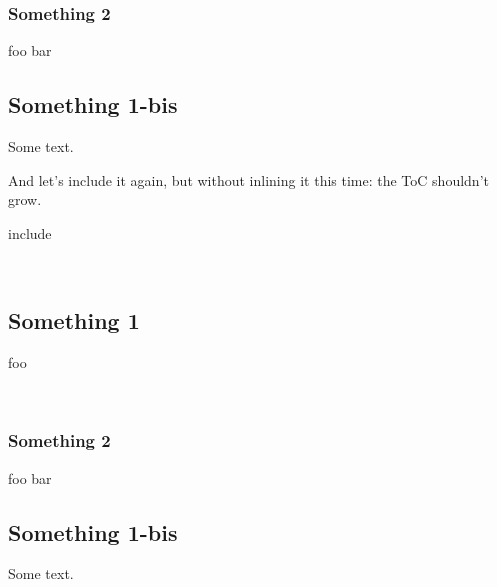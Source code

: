 \subsubsection{Something 2\label{something-2}}%
\label{package-test+u+package+++ml-module-Include+u+sections-val-bar}\begin{ocamlindent}foo bar\end{ocamlindent}%
\medbreak
\subsection{Something 1-bis\label{something-1-bis}}%
Some text.

And let's include it again, but without inlining it this time: the ToC shouldn't grow.

\begin{keyword}include\end{keyword}
 \hyperref[package-test+u+package+++ml-module-Include+u+sections-module-type-Something]{}\label{package-test+u+package+++ml-module-Include+u+sections-val-something}\\
\subsection{Something 1\label{something-1}}%
foo

\label{package-test+u+package+++ml-module-Include+u+sections-val-foo}\\
\subsubsection{Something 2\label{something-2}}%
\label{package-test+u+package+++ml-module-Include+u+sections-val-bar}\begin{ocamlindent}foo bar\end{ocamlindent}%
\medbreak
\subsection{Something 1-bis\label{something-1-bis}}%
Some text.



